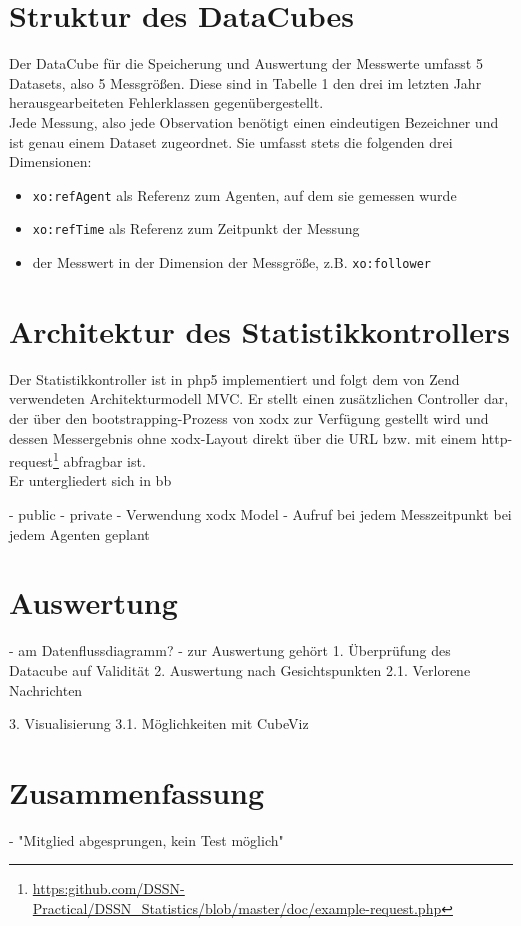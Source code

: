\documentclass{article}
\begin{document}
\section{Struktur des DataCubes}

Der DataCube für die Speicherung und Auswertung der Messwerte umfasst 5 Datasets, also 5 Messgrößen. Diese sind in Tabelle 1 den drei im letzten Jahr herausgearbeiteten Fehlerklassen gegenübergestellt.\\
Jede Messung, also jede Observation benötigt einen eindeutigen Bezeichner und ist genau einem Dataset zugeordnet. Sie umfasst stets die folgenden drei Dimensionen:
\begin{itemize}
	\item{\texttt{xo:refAgent} als Referenz zum Agenten, auf dem sie gemessen wurde}
	\item{\texttt{xo:refTime} als Referenz zum Zeitpunkt der Messung}
	\item{der Messwert in der Dimension der Messgröße, z.B. \texttt{xo:follower}}
\end{itemize}

\section{Architektur des Statistikkontrollers}
Der Statistikkontroller ist in php5 implementiert und folgt dem von Zend verwendeten Architekturmodell MVC. Er stellt einen zusätzlichen Controller dar, der über den bootstrapping-Prozess von xodx zur Verfügung gestellt wird und dessen Messergebnis ohne xodx-Layout direkt über die URL bzw. mit einem http-request\footnote{\url{https:github.com/DSSN-Practical/DSSN\_Statistics/blob/master/doc/example-request.php}} abfragbar ist.\\
Er untergliedert sich in bb


- public
- private
- Verwendung xodx Model
- Aufruf bei jedem Messzeitpunkt bei jedem Agenten geplant

\section{Auswertung}

- am Datenflussdiagramm?
- zur Auswertung gehört 
1. Überprüfung des Datacube auf Validität
2. Auswertung nach Gesichtspunkten
2.1. Verlorene Nachrichten

3. Visualisierung
3.1. Möglichkeiten mit CubeViz

\section{Zusammenfassung}

- "Mitglied abgesprungen, kein Test möglich"



\end{document}
